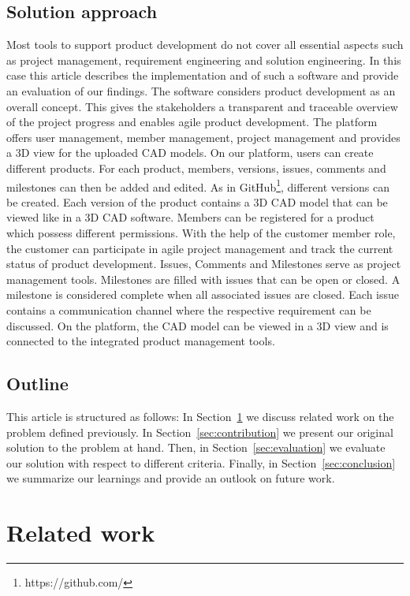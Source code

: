     \subsection*{Solution approach}
    Most tools to support product development do not cover all essential aspects such as project management, requirement engineering and solution engineering. In this case this article describes the implementation and of such a software and provide an evaluation of our findings.
    The software considers product development as an overall concept. This gives the stakeholders a transparent and traceable overview of the project progress and enables agile product development.
    The platform offers user management, member management, project management and provides a 3D view for the uploaded CAD models. On our platform, users can create different products. For each product, members, versions, issues, comments and milestones can then be added and edited. As in GitHub\footnote{https://github.com/}, different versions can be created. Each version of the product contains a 3D CAD model that can be viewed like in a 3D CAD software. Members can be registered for a product which possess different permissions. With the help of the customer member role, the customer can participate in agile project management and track the current status of product development. Issues, Comments and Milestones serve as project management tools. Milestones are filled with issues that can be open or closed. A milestone is considered complete when all associated issues are closed. Each issue contains a communication channel where the respective requirement can be discussed. On the platform, the CAD model can be viewed in a 3D view and is connected to the integrated product management tools.

    \subsection*{Outline}
    This article is structured as follows:
    In Section~\ref{sec:differentiation} we discuss related work on the problem defined previously.
    In Section~\ref{sec:contribution} we present our original solution to the problem at hand.
    Then, in Section~\ref{sec:evaluation} we evaluate our solution with respect to different criteria.
    Finally, in Section~\ref{sec:conclusion} we summarize our learnings and provide an outlook on future work.
    
    \section{Related work}
    \label{sec:differentiation}

